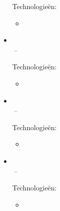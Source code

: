 \documentclass[11pt,a4paper]{article}
\begin{document}
\begin{itemize}[leftmargin=0pt,label={},itemsep=2em,topsep=0pt]
\vspace{0.2cm}
{\color{secondary}Technologieën:} \BakerTechnologyNL
\vspace{0.3cm}
\begin{itemize}[leftmargin=*,topsep=-6pt,parsep=0pt,partopsep=0pt,itemsep=0pt]
    \item \BakerShortNL
\end{itemize}


\item \parbox{\textwidth}{\textbf{\KempenNameNL} \hfill \textit{\KempenLocationNL}}\\
\textit{\KempenSecondJobTitleNL} \hfill \textit{\KempenFirstJobStartNL\,--\,\KempenSecondJobEndNL}

\vspace{0.2cm}
{\color{secondary}Technologieën:} \KempenTechnologyNL
\vspace{0.3cm}
\begin{itemize}[leftmargin=*,topsep=-6pt,parsep=0pt,partopsep=0pt,itemsep=0pt]
    \item \KempenShortNL
\end{itemize}


\item \parbox{\textwidth}{\textbf{\UnisysNameNL} \hfill \textit{\UnisysLocationNL}}\\
\textit{\UnisysJobTitleNL} \hfill \textit{\UnisysJobStartNL\,--\,\UnisysJobEndNL}

\vspace{0.2cm}
{\color{secondary}Technologieën:} \UnisysTechnologyNL
\vspace{0.3cm}
\begin{itemize}[leftmargin=*,topsep=-6pt,parsep=0pt,partopsep=0pt,itemsep=0pt]
    \item \UnisysShortNL
\end{itemize}


\item \parbox{\textwidth}{\textbf{\ACTNameNL} \hfill \textit{\ACTLocationNL}}\\
\textit{\ACTJobTitleNL} \hfill \textit{\ACTJobStartNL\,--\,\ACTJobEndNL}

\vspace{0.2cm}
{\color{secondary}Technologieën:} \ACTTechnologyNL
\vspace{0.3cm}
\begin{itemize}[leftmargin=*,topsep=-6pt,parsep=0pt,partopsep=0pt,itemsep=0pt]
    \item \ACTShortNL
\end{itemize}



\end{itemize}
\end{document}
